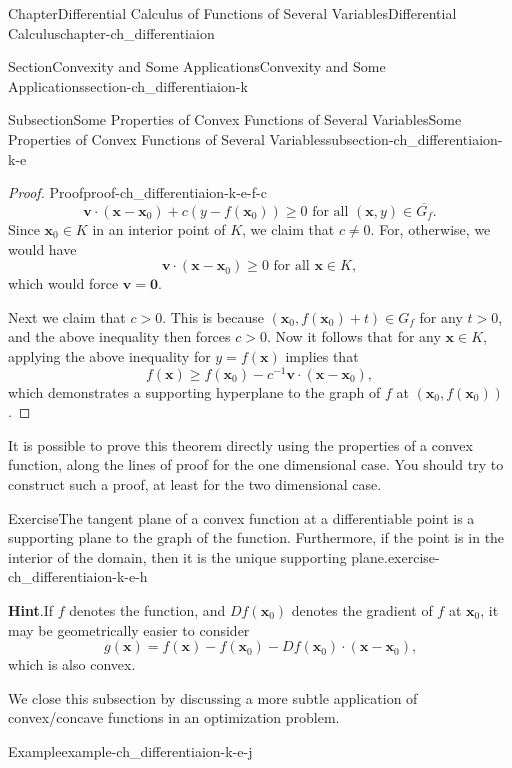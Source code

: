 \documentclass[oneside,10pt,]{book}
\newcommand{\blocktitlefont}{\relax}
\numberwithin{equation}{section}
\begin{document}
\begin{chapterptx}{Chapter}{Differential Calculus of Functions of Several Variables}{}{Differential Calculus}{}{}{chapter-ch_differentiaion}
\begin{sectionptx}{Section}{Convexity and Some Applications}{}{Convexity and Some Applications}{}{}{section-ch_differentiaion-k}
\begin{subsectionptx}{Subsection}{Some Properties of Convex Functions of Several Variables}{}{Some Properties of Convex Functions of Several Variables}{}{}{subsection-ch_differentiaion-k-e}
\begin{proof}{Proof}{}{proof-ch_differentiaion-k-e-f-c}
\begin{equation*}
\mathbf v \cdot (\mathbf x- \mathbf x_{0}) + c (y-f(\mathbf x_{0}))\ge 0 \text{ for all }
(\mathbf x, y) \in \overline{G_{f}}.
\end{equation*}
Since \(\mathbf x_{0}\in K\) in an interior point of \(K\), we claim that \(c\ne 0\). For, otherwise, we would have%
\begin{equation*}
\mathbf v \cdot (\mathbf x- \mathbf x_{0})\ge 0 \text{ for all } \mathbf x\in K,
\end{equation*}
which would force \(\mathbf v=\mathbf 0\).%
\par
Next we claim  that \(c>0\). This is because \((\mathbf x_{0}, f(\mathbf x_{0})+t)
\in G_{f}\) for any \(t>0\), and the above inequality then forces \(c>0\). Now it follows that for any \(\mathbf x\in K\), applying the above inequality for \(y=f(\mathbf x)\) implies that%
\begin{equation*}
f(\mathbf x) \ge f(\mathbf x_{0}) -c^{-1} \mathbf v \cdot (\mathbf x- \mathbf x_{0}),
\end{equation*}
which demonstrates a supporting hyperplane to the graph of \(f\) at  \((\mathbf x_{0}, f(\mathbf x_{0}))\).%
\end{proof}
It is possible to prove this theorem directly using the properties of a convex function, along the lines of proof for the one dimensional case. You should try to construct such a proof, at least for the two dimensional case.%
\begin{inlineexercise}{Exercise}{The tangent plane of a convex function at a differentiable point is a supporting plane to the graph of the function. Furthermore, if the point is in the interior of the domain, then it is the unique supporting plane.}{exercise-ch_differentiaion-k-e-h}%
\par\smallskip%
\noindent\textbf{\blocktitlefont Hint}.\hypertarget{hint-ch_differentiaion-k-e-h-c}{}\quad{}If \(f\) denotes the function, and \(Df(\mathbf x_{0})\) denotes the gradient of \(f\) at \(\mathbf x_{0}\), it may be geometrically easier to consider%
\begin{equation*}
g(\mathbf x)=f(\mathbf x)-f(\mathbf x_{0})-Df(\mathbf x_{0})\cdot (\mathbf x-\mathbf x_{0})\text{,}
\end{equation*}
which is also convex.\end{inlineexercise}%
We close this subsection by discussing a more subtle application of convex\slash{}concave functions in an optimization problem.%
\begin{example}{Example}{}{example-ch_differentiaion-k-e-j}%

\end{example}
\end{subsectionptx}
\end{sectionptx}
\end{chapterptx}
\end{document}
